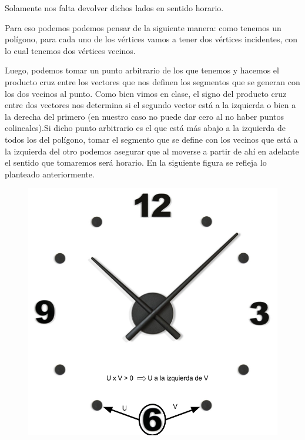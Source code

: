 Solamente nos falta devolver dichos lados en sentido horario.\newline

Para eso podemos podemos pensar de la siguiente manera: como tenemos un polígono, para cada uno de los vértices vamos a tener dos vértices incidentes, con lo cual tenemos dos vértices vecinos.\newline

Luego, podemos tomar un punto arbitrario de los que tenemos y hacemos el producto cruz entre los vectores que nos definen los segmentos que se generan con los dos vecinos al punto. Como bien vimos en clase, el signo del producto cruz entre dos vectores nos determina si el segundo vector está a la izquierda o bien a la derecha del primero (en nuestro caso no puede dar cero al no haber puntos colineales).Si dicho punto arbitrario es el que está más abajo a la izquierda de todos los del polígono, tomar el segmento que se define con los vecinos que está a la izquierda del otro podemos asegurar que al moverse a partir de ahí en adelante el sentido que tomaremos será horario. En la siguiente figura se refleja lo planteado anteriormente.

\begin{figure}[h!]
	\centering
	\includegraphics[scale = 0.25]{img/sentido-horario.png}
\end{figure}


